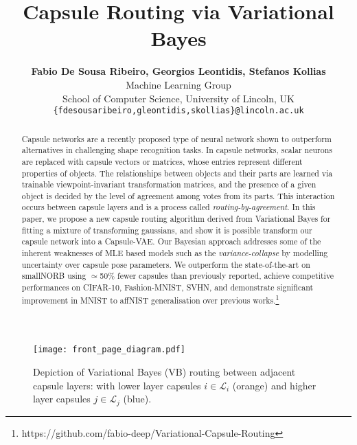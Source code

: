 \documentclass[letterpaper]{article} \usepackage{aaai20}  \usepackage{times}  \usepackage{helvet} \usepackage{courier}  \usepackage[hyphens]{url}  \usepackage{graphicx} \urlstyle{rm} \def\UrlFont{\rm}  \usepackage{graphicx}  \frenchspacing  \setlength{\pdfpagewidth}{8.5in}  \setlength{\pdfpageheight}{11in}  \nocopyright
\title{Capsule Routing via Variational Bayes}
\author{\Large \textbf{Fabio De Sousa Ribeiro, Georgios Leontidis, Stefanos Kollias} \\ 
Machine Learning Group \\ 
School of Computer Science, University of Lincoln, UK\\
\texttt{\{fdesousaribeiro,gleontidis,skollias\}@lincoln.ac.uk}}
\begin{document}
\maketitle
\begin{abstract}
Capsule networks are a recently proposed type of neural network shown to outperform alternatives in challenging shape recognition tasks. In capsule networks, scalar neurons are replaced with capsule vectors or matrices, whose entries represent different properties of objects. The relationships between objects and their parts are learned via trainable viewpoint-invariant transformation matrices, and the presence of a given object is decided by the level of agreement among votes from its parts. This interaction occurs between capsule layers and is a process called \textit{routing-by-agreement}. In this paper, we propose a new capsule routing algorithm derived from Variational Bayes for fitting a mixture of transforming gaussians, and show it is possible transform our capsule network into a Capsule-VAE. Our Bayesian approach addresses some of the inherent weaknesses of MLE based models such as the \textit{variance-collapse} by modelling uncertainty over capsule pose parameters. We outperform the state-of-the-art on smallNORB using $\simeq$50\% fewer capsules than previously reported, achieve competitive performances on CIFAR-10, Fashion-MNIST, SVHN, and demonstrate significant improvement in MNIST to affNIST generalisation over previous works.\footnote{https://github.com/fabio-deep/Variational-Capsule-Routing}
\end{abstract}
\begin{figure}[t]
    \centering
    \texttt{[image: front\_page\_diagram.pdf]}
 \caption{Depiction of Variational Bayes (VB) routing between adjacent capsule layers: with lower layer capsules $i\in\mathcal{L}_i$ (orange) and higher layer capsules $j\in\mathcal{L}_j$ (blue).}
\label{plots}
\end{figure}
\end{document}

